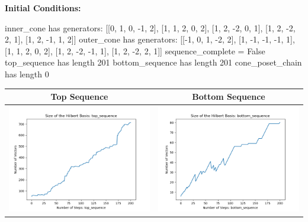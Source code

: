 \documentclass[10pt]{article}
\begin{document}
\textbf{Initial Conditions:}
\begin{SAGE}
inner_cone has generators: 
[[0, 1, 0, -1, 2], [1, 1, 2, 0, 2], [1, 2, -2, 0, 1], [1, 2, -2, 2, 1], [1, 2, -1, 1, 2]]
outer_cone has generators: 
[[-1, 0, 1, -2, 2], [1, -1, -1, -1, 1], [1, 1, 2, 0, 2], [1, 2, -2, -1, 1], [1, 2, -2, 2, 1]]
	sequence_complete = False
	top_sequence has length 201
	bottom_sequence has length 201
	cone_poset_chain has length 0

\end{SAGE}
\begin{tabular}{c|c}
\textbf{Top Sequence} & \textbf{Bottom Sequence} \\ \hline 
\begin{minipage}{.45\textwidth}
\includegraphics[width=\textwidth]{"DATA/5d/5 generators 2 bound I alternating/top_sequence SIZE"}
\end{minipage} &
\begin{minipage}{.45\textwidth}
\includegraphics[width=\textwidth]{"DATA/5d/5 generators 2 bound I alternating/bottom_sequence SIZE"}

\end{minipage}
\end{tabular}
\end{document}
